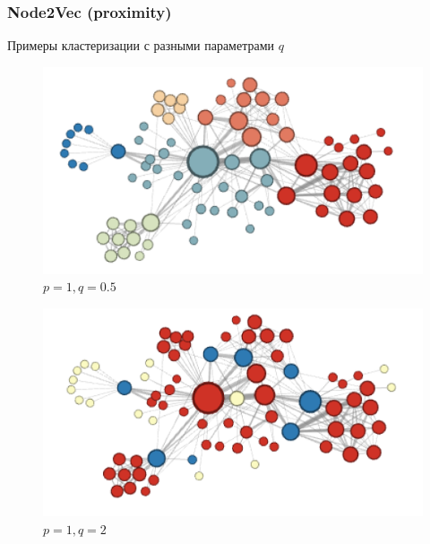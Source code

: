 \documentclass{beamer}
\begin{document}
\begin{frame}
    \frametitle{Node2Vec (proximity)}
    Примеры кластеризации с разными параметрами $q$
    \begin{multicols}{2}
        \begin{figure}
            \includegraphics[width=1\columnwidth]{q_0_5.png}
            \caption{$p = 1, q = 0.5$}
        \end{figure}
        \par 
        \begin{figure}
            \includegraphics[width=1\columnwidth]{q_2.png}
            \caption{$p = 1, q = 2$}
        \end{figure}
        \par
    \end{multicols}
\end{frame}
\end{document}
